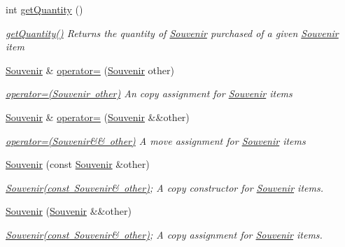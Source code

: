 \begin{DoxyCompactItemize}
int \mbox{\hyperlink{class_souvenir_ae539983b43f9d26125f54da500f3b5de}{get\+Quantity}} ()
\begin{DoxyCompactList}\small\item\em \mbox{\hyperlink{class_souvenir_ae539983b43f9d26125f54da500f3b5de}{get\+Quantity()}} Returns the quantity of \mbox{\hyperlink{class_souvenir}{Souvenir}} purchased of a given \mbox{\hyperlink{class_souvenir}{Souvenir}} item \end{DoxyCompactList}\item 
\mbox{\hyperlink{class_souvenir}{Souvenir}} \& \mbox{\hyperlink{class_souvenir_a546832baf66c42db5b75f7325572c4df}{operator=}} (\mbox{\hyperlink{class_souvenir}{Souvenir}} other)
\begin{DoxyCompactList}\small\item\em \mbox{\hyperlink{class_souvenir_a546832baf66c42db5b75f7325572c4df}{operator=(\+Souvenir other)}} An copy assignment for \mbox{\hyperlink{class_souvenir}{Souvenir}} items \end{DoxyCompactList}\item 
\mbox{\hyperlink{class_souvenir}{Souvenir}} \& \mbox{\hyperlink{class_souvenir_ac455fa569cbb12dc51d2b618f5000576}{operator=}} (\mbox{\hyperlink{class_souvenir}{Souvenir}} \&\&other)
\begin{DoxyCompactList}\small\item\em \mbox{\hyperlink{class_souvenir_ac455fa569cbb12dc51d2b618f5000576}{operator=(\+Souvenir\&\& other)}} A move assignment for \mbox{\hyperlink{class_souvenir}{Souvenir}} items \end{DoxyCompactList}\item 
\mbox{\hyperlink{class_souvenir_a358e41f53d1806aa00b8b1f2f31f4e11}{Souvenir}} (const \mbox{\hyperlink{class_souvenir}{Souvenir}} \&other)
\begin{DoxyCompactList}\small\item\em \mbox{\hyperlink{class_souvenir_a358e41f53d1806aa00b8b1f2f31f4e11}{Souvenir(const Souvenir\& other)}}; A copy constructor for \mbox{\hyperlink{class_souvenir}{Souvenir}} items. \end{DoxyCompactList}\item 
\mbox{\hyperlink{class_souvenir_a6486f07a7463ea7da5b947fd555c512d}{Souvenir}} (\mbox{\hyperlink{class_souvenir}{Souvenir}} \&\&other)
\begin{DoxyCompactList}\small\item\em \mbox{\hyperlink{class_souvenir_a358e41f53d1806aa00b8b1f2f31f4e11}{Souvenir(const Souvenir\& other)}}; A copy assignment for \mbox{\hyperlink{class_souvenir}{Souvenir}} items. \end{DoxyCompactList}\end{DoxyCompactItemize}


